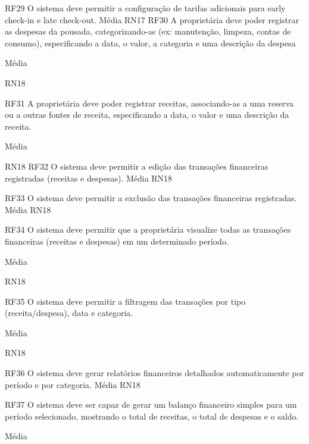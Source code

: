 RF29
O sistema deve permitir a configuração de tarifas adicionais para early check-in e late check-out.
Média
RN17
RF30
A proprietária deve poder registrar as despesas da pousada, categorizando-as (ex: manutenção, limpeza, contas de consumo), especificando a data, o valor, a categoria e uma descrição da despesa










Média








RN18




RF31
A proprietária deve poder registrar receitas, associando-as a uma reserva ou a outras fontes de receita, especificando a data, o valor e uma descrição da receita.




Média




RN18
RF32
O sistema deve permitir a edição das transações financeiras registradas (receitas e despesas).
Média
RN18


RF33
O sistema deve permitir a exclusão das transações financeiras registradas.
Média
RN18


RF34
O sistema deve permitir que a proprietária visualize todas as transações financeiras (receitas e despesas) em um determinado período.






Média




RN18


RF35
O sistema deve permitir a filtragem das transações por tipo (receita/despesa), data e categoria.




Média


RN18


RF36
O sistema deve gerar relatórios financeiros detalhados automaticamente por período e por categoria.
Média
RN18


RF37
O sistema deve ser capaz de gerar um balanço financeiro simples para um período selecionado, mostrando o total de receitas, o total de despesas e o saldo.






Média




